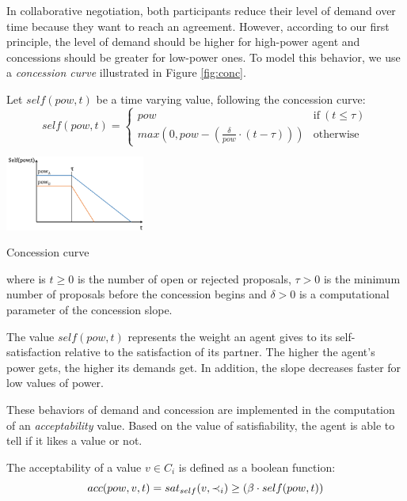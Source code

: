 \documentclass{llncs}
\begin{document}
		In collaborative negotiation, both participants reduce their level of demand over time because they want to reach an agreement. However, according to our first principle, the level of demand should be higher for high-power agent and concessions should be greater for low-power ones. To model this behavior, we use a \emph{concession curve} illustrated in Figure \ref{fig:conc}.
		
		Let $self(pow, t)$ be a time varying value, following the concession curve:
		\begin{equation}
		self(pow, t) = \left\{\begin{array}{ll}
		pow & \mathrm{if\ } (t \leq \tau)\\
		max(0, pow - (\frac{\delta}{pow} \cdot (t - \tau))) & \mathrm{otherwise}
		\end{array}\right.
		\end{equation}
			\begin{floatingfigure}[r]{1.8in}
				\includegraphics[width=1.8in]{graphs/sv3.png}
				\caption{\label{fig:conc}Concession curve}
			\end{floatingfigure} 
		where is $t \geq 0$ is the number of open or rejected proposals, $\tau > 0$ is the minimum number of proposals before the concession begins and $\delta > 0$ is a computational parameter of the concession slope.
		
		The value $self(pow,t)$ represents the weight an agent gives to its self-satisfaction relative to the satisfaction of its partner. The higher the agent's power gets, the higher its demands get. In addition, the slope decreases faster for low values of power.
		 
		These behaviors of demand and concession are implemented in the computation of an \textit{acceptability} value. Based on the value of satisfiability, the agent is able to tell if it likes a value or not.
		
		The acceptability of a value $v \in C_i$ is defined as a boolean function:
		\begin{equation}
		\vspace{-.5em} 
		acc(pow,v, t) = sat_{self}(v, \prec_i) \geq  (\beta \cdot self(pow,t))
		\end{equation}
		
\end{document}
